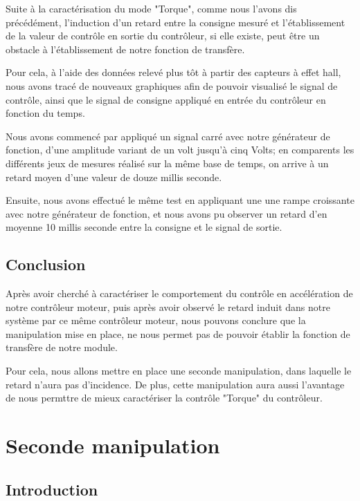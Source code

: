 \documentclass[french,a4paper,12pt]{report}
\begin{document}
		Suite à la caractérisation du mode "Torque", comme nous l'avons dis précédément, l'induction d'un retard entre la consigne mesuré et l'établissement de la valeur de contrôle en sortie du contrôleur, si elle existe, peut être un obstacle à l'établissement de notre fonction de transfère.
		
		Pour cela, à l'aide des données relevé plus tôt à partir des capteurs à effet hall, nous avons tracé de nouveaux graphiques afin de pouvoir visualisé le signal de contrôle, ainsi que le signal de consigne appliqué en entrée du contrôleur en fonction du temps.
		
		Nous avons commencé par appliqué un signal carré avec notre générateur de fonction, d'une amplitude variant de un volt jusqu'à cinq Volts; en comparents les différents jeux de mesures réalisé sur la même base de temps, on arrive à un retard moyen d'une valeur de douze millis seconde.
		
		Ensuite, nous avons effectué le même test en appliquant une une rampe croissante avec notre générateur de fonction, et nous avons pu observer un retard d'en moyenne 10 millis seconde entre la consigne et le signal de sortie.
		
		\subsection{Conclusion}
		Après avoir cherché à caractériser le comportement du contrôle en accélération de notre contrôleur moteur, puis après avoir observé le retard induit dans notre système par ce même contrôleur moteur, nous pouvons conclure que la manipulation mise en place, ne nous permet pas de pouvoir établir la fonction de transfère de notre module.
		
		Pour cela, nous allons mettre en place une seconde manipulation, dans laquelle le retard n'aura pas d'incidence. De plus, cette manipulation aura aussi l'avantage de nous permttre de mieux caractériser la contrôle "Torque" du contrôleur.
		
		\newpage		
		
	\section{Seconde manipulation}
	
		\subsection{Introduction}
	
\end{document}
